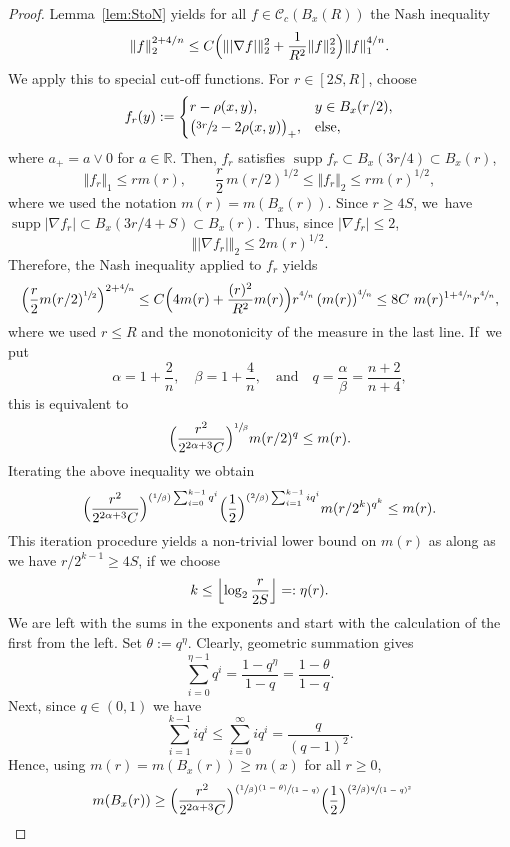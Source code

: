 \documentclass[10pt]{amsart}
\newcommand{\Psfrac}[2]{(\sfrac{#1}{#2})}
\newcommand{\pspfrac}[2]{\sfrac{(#1)}{(#2)}}
\theoremstyle{plain}
\theoremstyle{definition}
\newcommand{\cC}{\mathcal{C}}
\DeclareMathOperator{\supp}{supp}
\begin{document}
\begin{proof}
Lemma~\ref{lem:StoN} yields for all $f\in \cC_{c}(B_x(R))$ the Nash inequality
\[
\Vert f\Vert_2^{2+4/n}\leq C \Bigl(\Vert |\nabla f|\Vert_2^2+\frac{1}{R^2}\Vert f\Vert_2^2\Bigr)\Vert f\Vert_1^{4/n}.
\]
We apply this to special cut-off functions.
For {$r\in[2S,R]$}, choose
\[
f_r(y):=
\begin{cases}
{r}-\rho(x,y),& y\in B_{x}(r/2),\\
\bigl(\sfrac{3r}2-2\rho(x,y)\bigr)_+,&
\mbox{else},
\end{cases}
\]
where $a_+=a\vee0$ for $a\in \mathbb{R}$. Then, $f_r$ satisfies {$\supp f_r\subset B_x(3r/4)\subset B_x(r)$},
\[
\Vert f_r\Vert_1\leq {r} m(r), \quad
\quad \frac{r}{2}\,m(r/2)^{1/2}\leq \Vert f_r\Vert_2\leq {r} m(r)^{1/2},
\]
where we used the notation $ m(r)=m(B_{x}(r)) $.
Since {$ r\ge 4S $}, we~have
$\supp\vert \nabla f_r\vert\subset B_x(3r/4+S)\subset B_x(r)$. Thus, since $\vert \nabla f_r\vert\leq {2}$,
\[
\Vert \vert \nabla f_r\vert \Vert_2
\leq {2} m(r)^{1/2}.
\]
Therefore, the Nash inequality applied to $f_r$ yields
\[
\Bigl(\frac{r}2 m({r}/2)^{\sfrac12}\Bigr)^{2+\sfrac4n}
\leq
C \Bigl(4m(r)+\frac{({r})^2}{R^2}m({r})\Bigr)
{r}^{\sfrac4n}\left( m({r})\right)^{\sfrac4n}
\leq 8 C \ m(r)^{1+\sfrac4n}
r^{\sfrac4n},
\]
where we used {$ r\le R $} and the monotonicity of the measure in the last line. If~we
put
\[
\alpha=1+\frac2n,\quad \beta=1+\frac4n,\quad\text{and}\quad q=\frac\alpha\beta=\frac{n+2}{n+4},
\]
this is equivalent to
\[
\Bigl(\frac{r^2}{2^{2\alpha+3}C}\Bigr)^{\sfrac{1}{\beta}} m({r}/2)^{q}
\leq m(r).
\]
Iterating the above inequality we obtain
\[
\Bigl(\frac{r^2}{2^{2\alpha+3}C}\Bigr)^{\Psfrac{1}{\beta}\sum_{i=0}^{k-1}q^i}\Bigl(\frac12\Bigr)^{\Psfrac{2}{\beta}\sum_{i=1}^{k-1}iq^i}
m({r}/{2^k})^{q^k}
\leq m(r).
\]
This iteration procedure yields a non-trivial lower bound on $m(r)$ as along as we have $r/2^{k-1}\geq 4S$, \ie if we choose
\[
k\leq
\Bigl\lfloor \log_2\frac{r}{2 S}\Bigr\rfloor =:\eta(r).
\]
We are left with the sums in the exponents and start with the calculation of the first from the left. Set $\theta:=q^{\eta}$. Clearly, geometric summation gives
\[
\sum_{i=0}^{{\eta}-1}q^i=\frac{1-q^{{\eta}}}{1-q}=\frac{1-{{\theta}}}{1-q}.
\]
Next, since $q\in(0,1)$ we have
\[
\sum_{{i}=1}^{k-1}iq^{i}\leq \sum_{i=0}^\infty iq^i=\frac{q}{(q-1)^2}.
\]
Hence, using $m(r)=m(B_x(r))\geq m(x)$ for all $r\geq 0$,
{\begin{align*}
m(B_x(r))&\ge\Bigl(\frac{r^2}{2^{2\alpha+3} C }\Bigr)^{\Psfrac{1}{\beta}\pspfrac{1- {\theta}}{1-q}}
\Bigl({\frac 12}\Bigr)^{\Psfrac{2}{\beta}\sfrac{q}{(1-q)^2}}

\end{align*}}
\end{proof}
\end{document}
